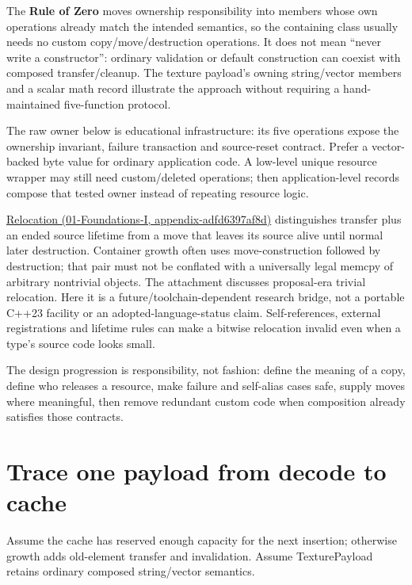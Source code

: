 The \textbf{Rule of Zero} moves ownership responsibility into members whose own operations already match the intended semantics, so the containing class usually needs no custom copy/move/destruction operations. It does not mean ``never write a constructor'': ordinary validation or default construction can coexist with composed transfer/cleanup. The texture payload's owning string/vector members and a scalar math record illustrate the approach without requiring a hand-maintained five-function protocol.

The raw owner below is educational infrastructure: its five operations expose the ownership invariant, failure transaction and source-reset contract. Prefer a vector-backed byte value for ordinary application code. A low-level unique resource wrapper may still need custom/deleted operations; then application-level records compose that tested owner instead of repeating resource logic.

\href{../01-Foundations-I/main.pdf\#nameddest=appendix-adfd6397af8d}{Relocation (01-Foundations-I, appendix-adfd6397af8d)} distinguishes transfer plus an ended source lifetime from a move that leaves its source alive until normal later destruction. Container growth often uses move-construction followed by destruction; that pair must not be conflated with a universally legal memcpy of arbitrary nontrivial objects. The attachment discusses proposal-era trivial relocation. Here it is a future/toolchain-dependent research bridge, not a portable C++23 facility or an adopted-language-status claim. Self-references, external registrations and lifetime rules can make a bitwise relocation invalid even when a type's source code looks small.

The design progression is responsibility, not fashion: define the meaning of a copy, define who releases a resource, make failure and self-alias cases safe, supply moves where meaningful, then remove redundant custom code when composition already satisfies those contracts.

\section{Trace one payload from decode to cache}\label{05-engine-i-ch003-trace-one-payload-from-decode-to-cache}

Assume the cache has reserved enough capacity for the next insertion; otherwise growth adds old-element transfer and invalidation. Assume TexturePayload retains ordinary composed string/vector semantics.

